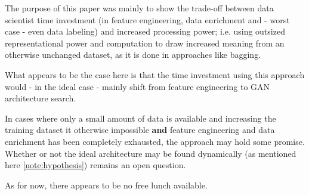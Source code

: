 The purpose of this paper was mainly to show the trade-off between data scientist time investment (in feature engineering, data enrichment and - worst case - even data labeling) and increased processing power; i.e. using outsized representational power and computation to draw increased meaning from an otherwise unchanged dataset, as it is done in approaches like \ac{bagging}.

What appears to be the case here is that the time investment using this approach would - in the ideal case - mainly shift from feature engineering to \ac{GAN} architecture search.

In cases where only a small amount of data is available and increasing the training dataset it otherwise impossible \textbf{and} feature engineering and data enrichment has been completely exhausted, the approach may hold some promise. Whether or not the ideal architecture may be found dynamically (as mentioned here \ref{note:hypothesis}) remains an open question.

As for now, there appears to be no free lunch available.

\pagebreak
